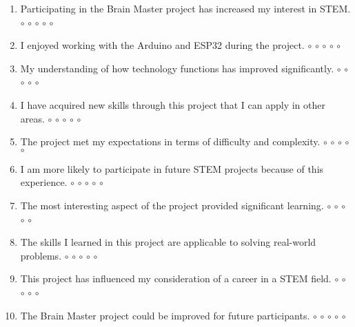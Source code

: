 \documentclass[10pt]{extarticle}
\begin{document}
\begin{enumerate}[label=\arabic*.]
    \vspace{3mm}
    \item Participating in the Brain Master project has increased my interest in STEM. \hfill $\circ$ $\circ$ $\circ$ $\circ$ $\circ$
    \vspace{3mm}
    
    \item I enjoyed working with the Arduino and ESP32 during the project. \hfill $\circ$ $\circ$ $\circ$ $\circ$ $\circ$
    \vspace{3mm}
    
    \item My understanding of how technology functions has improved significantly. \hfill $\circ$ $\circ$ $\circ$ $\circ$ $\circ$
    \vspace{3mm}
    
    \item I have acquired new skills through this project that I can apply in other areas. \hfill $\circ$ $\circ$ $\circ$ $\circ$ $\circ$
    \vspace{3mm}
    
    \item The project met my expectations in terms of difficulty and complexity. \hfill $\circ$ $\circ$ $\circ$ $\circ$ $\circ$
    \vspace{3mm}
    
    \item I am more likely to participate in future STEM projects because of this experience. \hfill $\circ$ $\circ$ $\circ$ $\circ$ $\circ$
    \vspace{3mm}
    
    \item The most interesting aspect of the project provided significant learning. \hfill $\circ$ $\circ$ $\circ$ $\circ$ $\circ$
    \vspace{3mm}
    
    \item The skills I learned in this project are applicable to solving real-world problems. \hfill $\circ$ $\circ$ $\circ$ $\circ$ $\circ$
    \vspace{3mm}
    
    \item This project has influenced my consideration of a career in a STEM field. \hfill $\circ$ $\circ$ $\circ$ $\circ$ $\circ$
    \vspace{3mm}
    
    \item The Brain Master project could be improved for future participants. \hfill $\circ$ $\circ$ $\circ$ $\circ$ $\circ$
    \vspace{3mm}

\end{enumerate}
\end{document}
